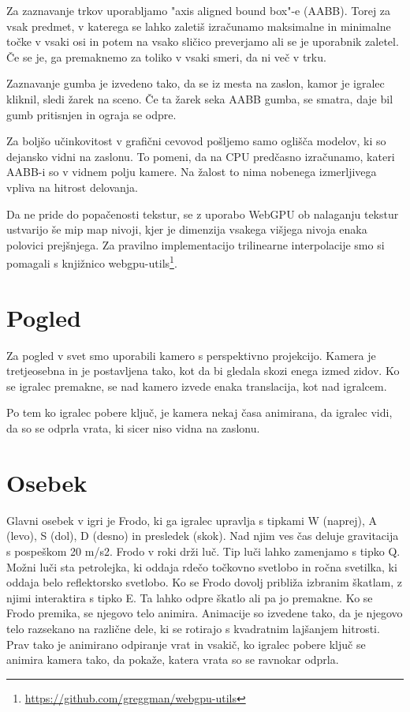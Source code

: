 \documentclass[a4paper,12pt]{article}
\begin{document}
Za zaznavanje trkov uporabljamo "axis aligned bound box"-e (AABB). Torej za vsak predmet, v katerega se lahko zaletiš izračunamo maksimalne in minimalne točke v vsaki osi in potem na vsako sličico preverjamo ali se je uporabnik zaletel. Če se je, ga premaknemo za toliko v vsaki smeri, da ni več v trku.

Zaznavanje gumba je izvedeno tako, da se iz mesta na zaslon, kamor je igralec kliknil, sledi žarek na sceno. Če ta žarek seka AABB gumba, se smatra, daje bil gumb pritisnjen in ograja se odpre.

Za boljšo učinkovitost v grafični cevovod pošljemo samo oglišča modelov, ki so dejansko vidni na zaslonu. To pomeni, da na CPU predčasno izračunamo, kateri AABB-i so v vidnem polju kamere. Na žalost to nima nobenega izmerljivega vpliva na hitrost delovanja.

Da ne pride do popačenosti tekstur, se z uporabo WebGPU ob nalaganju tekstur ustvarijo še mip map nivoji, kjer je dimenzija vsakega višjega nivoja enaka polovici prejšnjega. Za pravilno implementacijo trilinearne interpolacije smo si pomagali s knjižnico webgpu-utils\footnote{\url{https://github.com/greggman/webgpu-utils}}.

\section{Pogled}
\noindent Za pogled v svet smo uporabili kamero s perspektivno projekcijo. Kamera je tretjeosebna in je postavljena tako, kot da bi gledala skozi enega izmed zidov. Ko se igralec premakne, se nad kamero izvede enaka translacija, kot nad igralcem.

Po tem ko igralec pobere ključ, je kamera nekaj časa animirana, da igralec vidi, da so se odprla vrata, ki sicer niso vidna na zaslonu.


\section{Osebek}
\noindent Glavni osebek v igri je Frodo, ki ga igralec upravlja s tipkami W (naprej), A (levo), S (dol), D (desno) in presledek (skok). Nad njim ves čas deluje gravitacija s pospeškom 20 m/s2. Frodo v roki drži luč. Tip luči lahko zamenjamo s tipko Q. Možni luči sta petrolejka, ki oddaja rdečo točkovno svetlobo in ročna svetilka, ki oddaja belo reflektorsko svetlobo. Ko se Frodo dovolj približa izbranim škatlam, z njimi interaktira s tipko E. Ta lahko odpre škatlo ali pa jo premakne.
Ko se Frodo premika, se njegovo telo animira. Animacije so izvedene tako, da je njegovo telo razsekano na različne dele, ki se rotirajo s kvadratnim lajšanjem hitrosti. Prav tako je animirano odpiranje vrat in vsakič, ko igralec pobere ključ se animira kamera tako, da pokaže, katera vrata so se ravnokar odprla.
\end{document}
